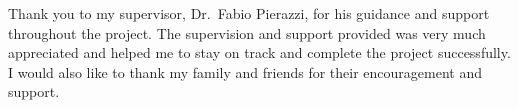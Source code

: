 Thank you to my supervisor, Dr.\ Fabio Pierazzi, for his guidance and support throughout the project. The supervision and support provided was very much appreciated and helped me to stay on track and complete the project successfully. I would also like to thank my family and friends for their encouragement and support.
